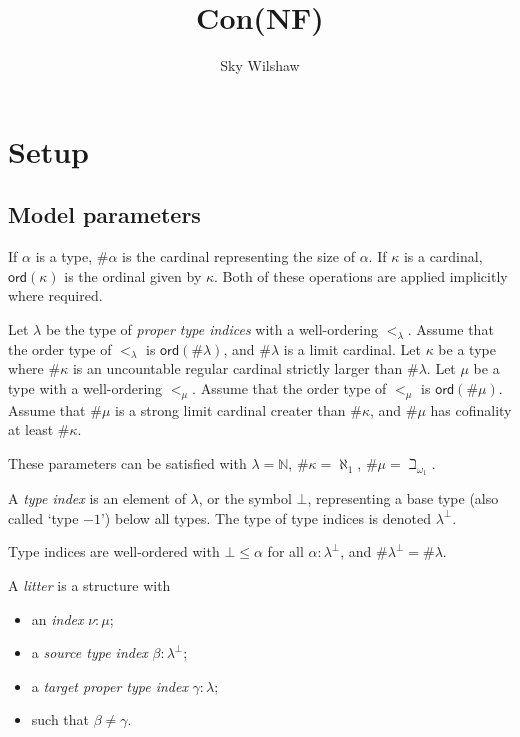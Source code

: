 \documentclass{article}
\title{Con(NF)}
\author{Sky Wilshaw}
\begin{document}
\maketitle

\section{Setup}

\subsection{Model parameters}

\begin{definition}
    If \( \alpha \) is a type, \( \# \alpha \) is the cardinal representing the size of \( \alpha \).
    If \( \kappa \) is a cardinal, \( \mathsf{ord}(\kappa) \) is the ordinal given by \( \kappa \).
    Both of these operations are applied implicitly where required.
\end{definition}
\begin{param}
    Let \( \lambda \) be the type of \emph{proper type indices} with a well-ordering \( <_\lambda \).
    Assume that the order type of \( <_\lambda \) is \( \mathsf{ord}(\#\lambda) \), and \( \#\lambda \) is a limit cardinal.
    Let \( \kappa \) be a type where \( \#\kappa \) is an uncountable regular cardinal strictly larger than \( \#\lambda \).
    Let \( \mu \) be a type with a well-ordering \( <_\mu \).
    Assume that the order type of \( <_\mu \) is \( \mathsf{ord}(\#\mu) \).
    Assume that \( \#\mu \) is a strong limit cardinal creater than \( \#\kappa \), and \( \#\mu \) has cofinality at least \( \#\kappa \).
\end{param}
\begin{remark}
    These parameters can be satisfied with \( \lambda = \mathbb N \), \( \#\kappa = \aleph_1 \), \( \#\mu = \beth_{\omega_1} \).
\end{remark}
\begin{definition}
    A \emph{type index} is an element of \( \lambda \), or the symbol \( \bot \), representing a base type (also called `type \( -1 \)') below all types.
    The type of type indices is denoted \( \lambda^\bot \).
\end{definition}
\begin{lemma}
    Type indices are well-ordered with \( \bot \le \alpha \) for all \( \alpha : \lambda^\bot \), and \( \#\lambda^\bot = \#\lambda \).
\end{lemma}
\begin{definition}
    A \emph{litter} is a structure with
    \begin{itemize}
        \item an \emph{index} \( \nu : \mu \);
        \item a \emph{source type index} \( \beta : \lambda^\bot \);
        \item a \emph{target proper type index} \( \gamma : \lambda \);
        \item such that \( \beta \neq \gamma \).
    \end{itemize}
\end{definition}
\end{document}
